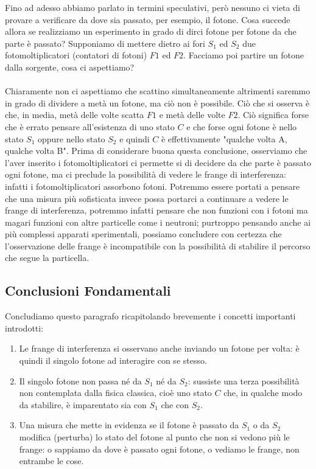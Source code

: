 	Fino ad adesso abbiamo parlato in termini speculativi, però nessuno ci vieta di provare a verificare da dove sia passato, per esempio, il fotone. Cosa succede allora se realizziamo un esperimento in grado di dirci fotone per fotone da che parte è passato? Supponiamo di mettere dietro ai fori $S_1$ ed $S_2$ due fotomoltiplicatori (contatori di fotoni) $F1$ ed $F2$. Facciamo poi partire un fotone dalla sorgente, cosa ci aspettiamo?
	\\
	\\
	Chiaramente non ci aspettiamo che scattino simultaneamente altrimenti saremmo in grado di dividere a metà un fotone, ma ciò non è possibile. Ciò che si osserva è che, in media, metà delle volte scatta $F1$ e metà delle volte $F2$. Ciò significa forse che è errato pensare all’esistenza di uno stato $C$ e che forse ogni fotone è nello stato $S_1$ oppure nello stato $S_2$ e quindi $C$ è effettivamente "qualche volta A, qualche volta B". Prima di considerare buona questa conclusione, osserviamo che l’aver inserito i fotomoltiplicatori ci permette si di decidere da che parte è passato ogni fotone, ma ci preclude la possibilità di vedere le frange di interferenza: infatti i fotomoltiplicatori assorbono fotoni. Potremmo essere portati a pensare che una misura più sofisticata invece possa portarci a continuare a vedere le frange di interferenza, potremmo infatti pensare che non funzioni con i fotoni ma magari funzioni con altre particelle come i neutroni; purtroppo pensando anche ai più complessi apparati sperimentali, possiamo concludere con certezza che l'osservazione delle frange è incompatibile con la possibilità di stabilire il percorso che segue la particella.

\subsection{Conclusioni Fondamentali}

	Concludiamo questo paragrafo ricapitolando brevemente i concetti importanti introdotti:

\begin{enumerate}
	\item Le frange di interferenza si osservano anche inviando un fotone per volta: è quindi il singolo fotone ad interagire con se stesso.
	\item  Il singolo fotone non passa né da $S_1$ né da $S_2$: sussiste una terza possibilità non contemplata dalla fisica classica, cioè uno stato $C$ che, in qualche modo da stabilire, è imparentato sia con $S_1$ che con $S_2$.
	\item Una misura che mette in evidenza se il fotone è passato da $S_1$ o da $S_2$ modifica (perturba) lo stato del fotone al punto che non si vedono più le frange: o sappiamo da dove è passato ogni fotone, o vediamo le frange, non entrambe le cose.
\end{enumerate}

